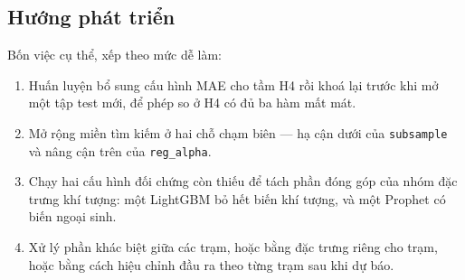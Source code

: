 \documentclass[12pt,a4paper]{article}
\begin{document}
\subsection{Hướng phát triển}

Bốn việc cụ thể, xếp theo mức dễ làm:

\begin{enumerate}
    \item Huấn luyện bổ sung cấu hình MAE cho tầm H4 rồi khoá lại trước khi mở một tập test
    mới, để phép so ở H4 có đủ ba hàm mất mát.
    \item Mở rộng miền tìm kiếm ở hai chỗ chạm biên --- hạ cận dưới của \texttt{subsample} và
    nâng cận trên của \texttt{reg\_alpha}.
    \item Chạy hai cấu hình đối chứng còn thiếu để tách phần đóng góp của nhóm đặc trưng khí
    tượng: một LightGBM bỏ hết biến khí tượng, và một Prophet có biến ngoại sinh.
    \item Xử lý phần khác biệt giữa các trạm, hoặc bằng đặc trưng riêng cho trạm, hoặc bằng
    cách hiệu chỉnh đầu ra theo từng trạm sau khi dự báo.
\end{enumerate}
\end{document}
